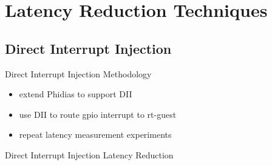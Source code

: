 \documentclass[10pt,hyperref={hyperfootnotes=false}, xcolor={usenames, dvipsnames}]{beamer}
\begin{document}


\section{Latency Reduction Techniques}

\subsection{Direct Interrupt Injection}
\begin{frame} {Direct Interrupt Injection} {Methodology}
    
	\begin{itemize}
      \item {extend Phidias to support DII} \pause {}
      \item {use DII to route gpio interrupt to rt-guest} \pause {}
			\begingroup
			
			\endgroup
			\pause {}
   	  \item {repeat latency measurement experiments} \pause {}
    \end{itemize}
    
\end{frame}

\begin{frame} [allowframebreaks] {Direct Interrupt Injection} {Latency Reduction}
	
\end{frame}
\end{document}
